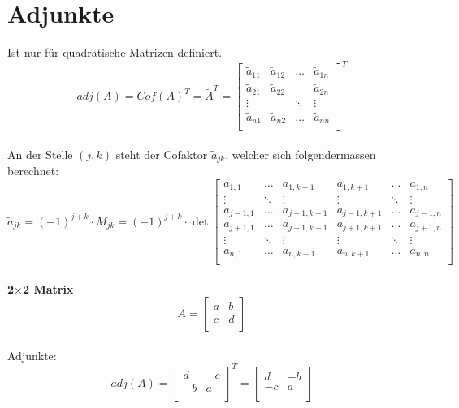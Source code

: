 \section{Adjunkte}
Ist nur für quadratische Matrizen definiert.
\[
	adj(A) = Cof(A)^T = \tilde{A}^T =
	\begin{bmatrix}
		\tilde{a}_{11} & \tilde{a}_{12} & \ldots & \tilde{a}_{1n}\\
		\tilde{a}_{21} & \tilde{a}_{22} & 		 & \tilde{a}_{2n}\\
		\vdots		   &				& \ddots & \vdots \\
		\tilde{a}_{n1} & \tilde{a}_{n2} & \ldots & \tilde{a}_{nn}\\
	\end{bmatrix}^T
\]
\\
An der Stelle $(j,k)$ steht der Cofaktor $\tilde{a}_{jk}$, welcher sich folgendermassen berechnet:
\[
	\tilde{a}_{jk} = (-1)^{j+k}\cdot M_{jk} = (-1)^{j+k}\cdot \det
	\begin{bmatrix}
		a_{1,1} & \ldots & a_{1,k-1} & a_{1,k+1} & \ldots & a_{1,n} \\
		\vdots  & \ddots & \vdots    & \vdots    & \ddots & \vdots  \\
		a_{j-1,1} & \ldots & a_{j-1,k-1} & a_{j-1,k+1} & \ldots & a_{j-1,n} \\
		a_{j+1,1} & \ldots & a_{j+1,k-1} & a_{j+1,k+1} & \ldots & a_{j+1,n} \\
		\vdots  & \ddots & \vdots    & \vdots    & \ddots & \vdots  \\
		a_{n,1} & \ldots & a_{n,k-1} & a_{n,k+1} & \ldots & a_{n,n} \\
	\end{bmatrix}
\]
\\
\textbf{2$\times$2 Matrix}
\[
	A = 
	\begin{bmatrix}
		a & b \\
		c & d \\
	\end{bmatrix}
\]
\\
Adjunkte:
\[
	adj(A) =
	\begin{bmatrix}
		d & -c \\
		-b & a \\
	\end{bmatrix}^T =
	\begin{bmatrix}
		d & -b \\
		-c & a \\
	\end{bmatrix}
\]

